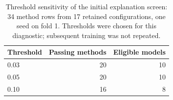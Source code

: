 \begin{table}[t]
\caption{Threshold sensitivity of the initial explanation screen: 34 method rows from 17 retained configurations, one seed on fold 1. Thresholds were chosen for this diagnostic; subsequent training was not repeated.}
\label{tab:gate_sensitivity}
\centering\small
\setlength{\tabcolsep}{3pt}
\begin{tabular}{lrr}
\toprule
Threshold & Passing methods & Eligible models\\
\midrule
0.03 & 20 & 10\\
0.05 & 20 & 10\\
0.10 & 16 & 8\\
\bottomrule
\end{tabular}
\end{table}
